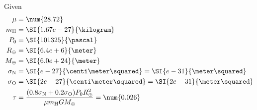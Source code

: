 \documentclass{article}
\begin{document}
Given
\begin{align}
    \mu &= \num{28.72} \\
    m_{\ce{H}} &= \SI{1.67e-27}{\kilogram} \\
    P_0 &= \SI{101325}{\pascal} \\
    R_\oplus &= \SI{6.4e+6}{\meter} \\
    M_\oplus &= \SI{6.0e+24}{\meter} \\
    \sigma_{\ce{N}} &= \SI{e-27}{\centi\meter\squared} = \SI{e-31}{\meter\squared} \\
    \sigma_{\ce{O}} &= \SI{2e-27}{\centi\meter\squared} = \SI{2e-31}{\meter\squared} \\
    \tau &= \frac{(0.8\sigma_{\ce{N}} + 0.2\sigma_{\ce{O}}) P_0 R_\oplus^2}{\mu m_{\ce{H}} G M_\oplus} = \num{0.026}
\end{align}
\end{document}
